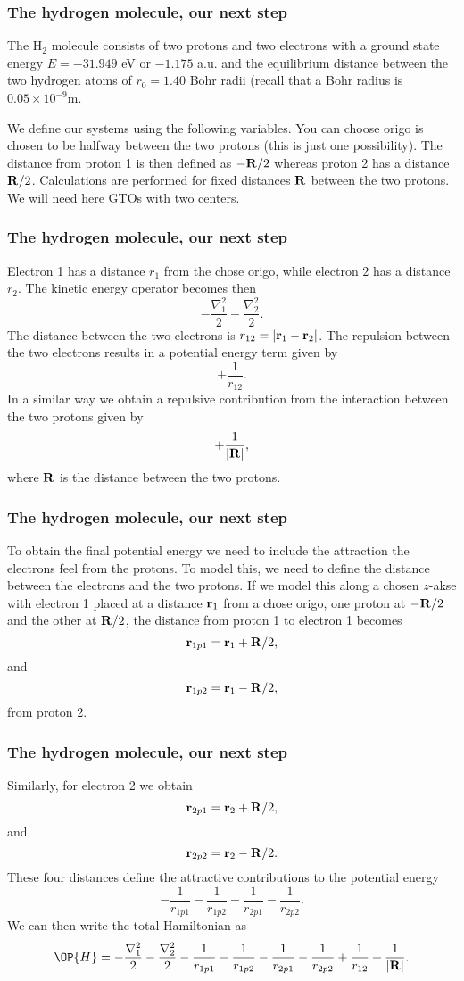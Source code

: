 \frame
{
  \frametitle{The hydrogen molecule, our next step}
\begin{small}
{\scriptsize
The 
H$_2$ molecule consists of two protons and two electrons 
with a ground state energy $E=-31.949$ eV or $-1.175$ a.u. and the 
equilibrium distance between the two hydrogen atoms
of $r_0=1.40$ Bohr radii (recall that a Bohr radius is $0.05\times 10^{-9}$m.


We define our systems using the following variables.
You can choose origo is chosen to be halfway between the two protons (this is just one possibility). The distance from 
proton 1 is then defined as 
$-{\bf R}/2$ whereas proton 2 has a distance ${\bf R}/2$.
Calculations are performed for fixed distances ${\bf R}$ between the two protons.
We will need here GTOs with two centers.
}
\end{small}
}


\frame
{
  \frametitle{The hydrogen molecule, our next step}
\begin{small}
{\scriptsize
Electron 1 has a distance $r_1$ from the chose origo, while  electron $2$
has a distance $r_2$. 
The kinetic energy operator becomes then
\[
   -\frac{\nabla_1^2}{2}-\frac{\nabla_2^2}{2}.
\]
The distance between the two electrons is
$r_{12}=|{\bf r}_1-{\bf r}_2|$. 
The repulsion between the two electrons results in a potential energy term given by
\[
               +\frac{1}{r_{12}}.
\]
In a similar way we obtain a repulsive contribution from the interaction between the two 
protons given by
\[
               +\frac{1}{|{\bf R}|},
\]
where ${\bf R}$ is the distance between the two protons.
}
\end{small}
}


\frame
{
  \frametitle{The hydrogen molecule, our next step}
\begin{small}
{\scriptsize
To obtain the final potential energy we need to include the attraction the electrons feel from the protons.
To model this, we need to define the distance between the electrons and the two protons.
If we model this along a 
chosen $z$-akse with electron 1 placed at a distance 
${\bf r}_1$ from a chose origo, one proton at $-{\bf R}/2$
and the other at  ${\bf R}/2$, 
the distance from proton 1 to electron 1 becomes
\[
{\bf r}_{1p1}={\bf r}_1+ {\bf R}/2,
\]
and
\[
{\bf r}_{1p2}={\bf r}_1- {\bf R}/2,
\]
from proton 2.
}
\end{small}
}


\frame
{
  \frametitle{The hydrogen molecule, our next step}
\begin{small}
{\scriptsize
Similarly, for electron 2 we obtain
\[
{\bf r}_{2p1}={\bf r}_2+{\bf R}/2,
\]
and
\[
{\bf r}_{2p2}={\bf r}_2-{\bf R}/2.
\]
These four distances define the attractive contributions to the potential energy
\[
   -\frac{1}{r_{1p1}}-\frac{1}{r_{1p2}}-\frac{1}{r_{2p1}}-\frac{1}{r_{2p2}}.
\]
We can then write the total Hamiltonian as 
\[
   \OP{H}=-\frac{\nabla_1^2}{2}-\frac{\nabla_2^2}{2}
   -\frac{1}{r_{1p1}}-\frac{1}{r_{1p2}}-\frac{1}{r_{2p1}}-\frac{1}{r_{2p2}}
               +\frac{1}{r_{12}}+\frac{1}{|{\bf R}|}.
\]
}
\end{small}
}

